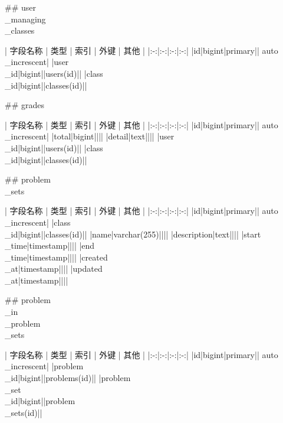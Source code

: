 \documentclass{ctexart}
\begin{document}
\begin{markdown}
\begin{center}
\end{center}

## user\\\_managing\\\_classes

\begin{center}

| 字段名称 | 类型 | 索引 | 外键 | 其他 |
|:-:|:-:|:-:|:-:|
|id|bigint|primary|| auto\\\_increscent|
|user\\\_id|bigint||users(id)||
|class\\\_id|bigint||classes(id)||

\end{center}

## grades

\begin{center}

| 字段名称 | 类型 | 索引 | 外键 | 其他 |
|:-:|:-:|:-:|:-:|
|id|bigint|primary|| auto\\\_increscent|
|total|bigint||||
|detail|text||||
|user\\\_id|bigint||users(id)||
|class\\\_id|bigint||classes(id)||

\end{center}

## problem\\\_sets

\begin{center}

| 字段名称 | 类型 | 索引 | 外键 | 其他 |
|:-:|:-:|:-:|:-:|
|id|bigint|primary|| auto\\\_increscent|
|class\\\_id|bigint||classes(id)||
|name|varchar(255)||||
|description|text||||
|start\\\_time|timestamp||||
|end\\\_time|timestamp||||
|created\\\_at|timestamp||||
|updated\\\_at|timestamp||||

\end{center}

## problem\\\_in\\\_problem\\\_sets

\begin{center}

| 字段名称 | 类型 | 索引 | 外键 | 其他 |
|:-:|:-:|:-:|:-:|
|id|bigint|primary|| auto\\\_increscent|
|problem\\\_id|bigint||problems(id)||
|problem\\\_set\\\_id|bigint||problem\\\_sets(id)||


\end{center}
\end{markdown}
\end{document}

